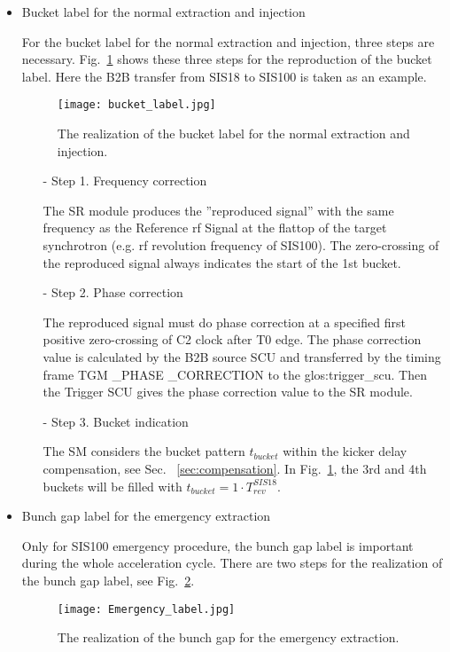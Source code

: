 \begin{itemize}
\item Bucket label for the normal extraction and injection

For the bucket label for the normal extraction and injection, three steps are necessary. Fig.~\ref{bucket_label} shows these three steps for the reproduction of the bucket label. Here the B2B transfer from SIS18 to SIS100 is taken as an example.
\begin{figure}[H]
   \centering   
   \texttt{[image: bucket\_label.jpg]}
   \caption{The realization of the bucket label for the normal extraction and injection.}
   \label{bucket_label}
\end{figure}  
\begin{itemize}
\item[-] Step 1. Frequency correction

The \gls{SR} module produces the ''reproduced signal'' with  the same frequency as the Reference rf Signal at the flattop of the target synchrotron (e.g. rf revolution frequency of SIS100). The zero-crossing of the reproduced signal always indicates the start of the 1st bucket.
\item[-] Step 2. Phase correction

The reproduced signal must do phase correction at a specified first positive zero-crossing of C2 clock after T0 edge. The phase correction value is calculated by the B2B source SCU and transferred by the timing frame TGM \_PHASE \_CORRECTION to the \gls{glos:trigger_scu}. Then the Trigger SCU gives the phase correction value to the SR module.

\item[-] Step 3. Bucket indication

The SM considers the bucket pattern $t_{\mathit{bucket}}$ within the kicker delay compensation, see Sec. ~\ref{sec:compensation}. In Fig.~\ref{bucket_label}, the 3rd and 4th buckets will be filled with $t_{\mathit{bucket}}=1\cdot T_{\mathit{rev}}^{\mathit{SIS18}}$. 
\end{itemize}

\item Bunch gap label for the emergency extraction

Only for SIS100 emergency procedure, the bunch gap label is important during the whole acceleration cycle. There are two steps for the realization of the bunch gap label, see Fig.~\ref{Emergency_label}.
\begin{figure}[!htb]
   \centering   
   \texttt{[image: Emergency\_label.jpg]}
   \caption{The realization of the bunch gap for the emergency extraction.}
   \label{Emergency_label}
\end{figure} 


\end{itemize}
